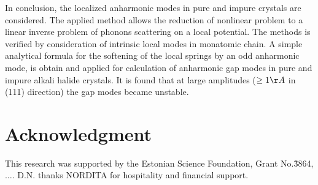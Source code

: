 {{In conclusion, the  localized anharmonic modes in pure and impure crystals 
are considered. The applied method allows the reduction of nonlinear problem 
to a linear inverse problem of phonons scattering on a local potential. 
The methods is verified by consideration of            
intrinsic local  modes in monatomic chain. A simple analytical formula 
for the  softening of the
local springs by an odd anharmonic mode,  is obtain  and applied for  
calculation of anharmonic gap modes in pure and 
impure alkali halide crystals. It is found that at large amplitudes 
($\geq 1 \AA$ in (111) direction) the gap modes became unstable.
 


\section{Acknowledgment} 
This research was supported by the Estonian Science Foundation, Grant 
No.\~3864,$\ldots$.  D.N. thanks NORDITA for hospitality and financial support.
 
\begin{thebibliography}{99}


\end{thebibliography}}}
